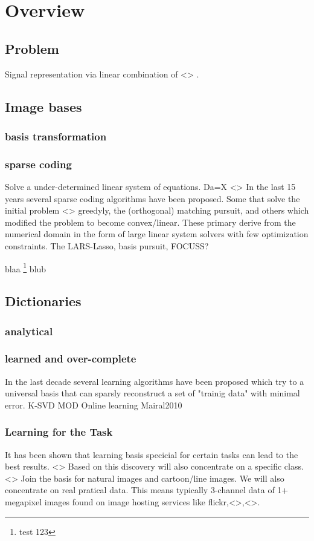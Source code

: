 \chapter{Overview}


\section{Problem}
Signal representation via linear combination of <> .
\section{Image bases}
\subsection{basis transformation}

\subsection{sparse coding}
Solve a under-determined linear system of equations. 
Da=X
<>
In the last 15 years several sparse coding algorithms have been proposed. Some that solve the initial problem <> greedyly, the (orthogonal) matching pursuit, and others which modified the problem to become convex/linear. These primary derive from the numerical domain in the form of 
large linear system solvers with few optimization constraints. The LARS-Lasso, basis pursuit, FOCUSS?


blaa \footnote{test 123} blub


\section{Dictionaries}
\subsection{analytical}
\subsection{learned and over-complete}
In the last decade several learning algorithms have been proposed which try to a universal basis that 
can sparsly reconstruct a set of "trainig data" with minimal error. 
K-SVD
MOD
Online learning
Mairal2010

\subsection{Learning for the Task}
It has been shown that learning basis specicial for certain tasks can lead to the best results\cite{}.  <>
Based on this discovery will also concentrate on a specific class. <> Join the basis for natural images and cartoon/line images.
We will also concentrate on real pratical data. This means typically 3-channel data of 1+ megapixel images found on image hosting services like flickr,<>,<>.

